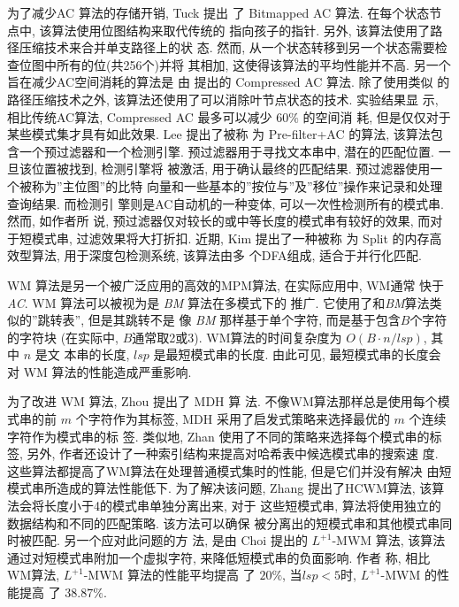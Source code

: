为了减少\textsf{AC} 算法的存储开销, Tuck \cite{Tuck2004} 提出
了 Bitmapped AC 算法. 在每个状态节点中, 该算法使用位图结构来取代传统的
指向孩子的指针. 另外, 该算法使用了路径压缩技术来合并单支路径上的状
态. 然而, 从一个状态转移到另一个状态需要检查位图中所有的位(共256个)并将
其相加, 这使得该算法的平均性能并不高. 另一个旨在减少AC空间消耗的算法是
由 \cite{Bremler2011} 提出的 \textsf{Compressed AC} 算法. 除了使用类似
的路径压缩技术之外, 该算法还使用了可以消除叶节点状态的技术. 实验结果显
示, 相比传统AC算法, \textsf{Compressed AC} 最多可以减少 $60\%$ 的空间消
耗, 但是仅仅对于某些模式集才具有如此效果. Lee \cite{Lee2013} 提出了被称
为 \textsf{Pre-filter+AC} 的算法, 该算法包含一个预过滤器和一个检测引擎.
预过滤器用于寻找文本串中, 潜在的匹配位置. 一旦该位置被找到, 检测引擎将
被激活, 用于确认最终的匹配结果. 预过滤器使用一个被称为''主位图''的比特
向量和一些基本的''按位与''及''移位''操作来记录和处理查询结果. 而检测引
擎则是AC自动机的一种变体, 可以一次性检测所有的模式串. 然而, 如作者所
说, 预过滤器仅对较长的或中等长度的模式串有较好的效果, 而对于短模式串,
过滤效果将大打折扣. 近期, Kim \cite{Kim2015} 提出了一种被称
为 \textsf{Split} 的内存高效型算法, 用于深度包检测系统, 该算法由多
个DFA组成, 适合于并行化匹配.

\textsf{WM} 算法是另一个被广泛应用的高效的MPM算法, 在实际应用中, WM通常
快于\emph{AC}. \textsf{WM} 算法可以被视为是 \emph{BM} 算法在多模式下的
推广. 它使用了和\emph{BM}算法类似的''跳转表'', 但是其跳转不是
像 \emph{BM} 那样基于单个字符, 而是基于包含$B$个字符的字符块 (在实际中,
$B$通常取2或3). WM算法的时间复杂度为 $O(B \cdot n/lsp)$, 其中 $n$ 是文
本串的长度, $lsp$ 是最短模式串的长度. 由此可见, 最短模式串的长度会
对 WM 算法的性能造成严重影响.

为了改进 \textsf{WM} 算法, Zhou \cite{Zhou2007} 提出了 \textsf{MDH} 算
法. 不像WM算法那样总是使用每个模式串的前 $m$ 个字符作为其标签,
\textsf{MDH} 采用了启发式策略来选择最优的 $m$ 个连续字符作为模式串的标
签. 类似地, Zhan \cite{Zhan2014} 使用了不同的策略来选择每个模式串的标
签, 另外, 作者还设计了一种索引结构来提高对哈希表中候选模式串的搜索速
度. 这些算法都提高了WM算法在处理普通模式集时的性能, 但是它们并没有解决
由短模式串所造成的算法性能低下. 为了解决该问题, Zhang \cite{Zhang2009}
提出了\textsf{HCWM}算法, 该算法会将长度小于4的模式串单独分离出来, 对于
这些短模式串, 算法将使用独立的数据结构和不同的匹配策略. 该方法可以确保
被分离出的短模式串和其他模式串同时被匹配. 另一个应对此问题的方
法, 是由 Choi \cite{Choi2011} 提出的 \textsf{$L^{+1}$-MWM} 算法, 该算法
通过对短模式串附加一个虚拟字符, 来降低短模式串的负面影响. 作者
称, 相比WM算法, \textsf{$L^{+1}$-MWM} 算法的性能平均提高
了 $20\%$, 当$lsp < 5$时, \textsf{$L^{+1}$-MWM} 的性能提高
了 $38.87\%$.


